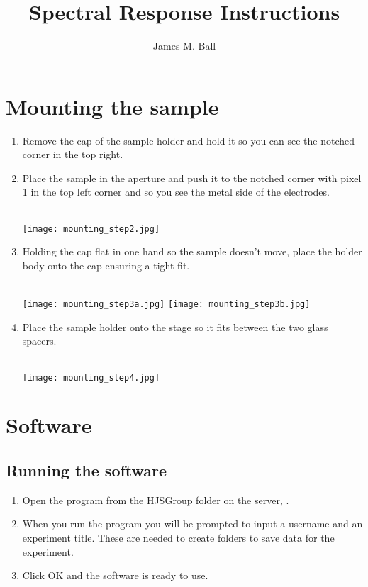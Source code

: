\documentclass{article}
\title{Spectral Response Instructions}
\author{James M. Ball}
\begin{document}
\maketitle

\section{Mounting the sample}
\begin{enumerate}
    \item Remove the cap of the sample holder and hold it so you can see the
    notched corner in the top right.
    \item Place the sample in the aperture and push it to the notched corner
    with pixel 1 in the top left corner and so you see the metal side of the
    electrodes.
    \\
    \\
    \begin{minipage}{\linewidth}
        \centering
        \texttt{[image: mounting\_step2.jpg]}
    \end{minipage}
    \item Holding the cap flat in one hand so the sample doesn't move, place
    the holder body onto the cap ensuring a tight fit.
    \\
    \\
    \begin{minipage}{\linewidth}
        \centering
        \texttt{[image: mounting\_step3a.jpg]}
        \texttt{[image: mounting\_step3b.jpg]}
    \end{minipage}
    \item Place the sample holder onto the stage so it fits between the two
    glass spacers.
    \\
    \\
    \begin{minipage}{\linewidth}
        \centering
        \texttt{[image: mounting\_step4.jpg]}
    \end{minipage}
\end{enumerate}

\section{Software}
\subsection{Running the software}
\begin{enumerate}
    \item Open the program from the HJSGroup folder on the server,
    .
    \item When you run the program you will be prompted to input a username and
    an experiment title. These are needed to create folders to save data for
    the experiment.
    \item Click OK and the software is ready to use.
\end{enumerate}
\end{document}
